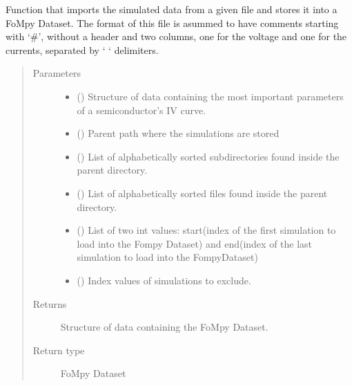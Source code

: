\documentclass[letterpaper,10pt,english,openany, oneside]{sphinxmanual}
\begin{document}
\begin{fulllineitems}
\label{\detokenize{index:fompy.fds.file}}
Function that imports the simulated data from a given file and
stores it into a FoMpy Dataset. The format of this file is asummed to have comments
starting with ‘\#’, without a header and two columns, one for the voltage and one for the currents, separated
by ‘    ‘ delimiters.
\begin{quote}\begin{description}
\item[{Parameters}] \leavevmode\begin{itemize}
\item {} 
 () \textendash{} Structure of data containing the most important parameters of a semiconductor’s IV curve.

\item {} 
 () \textendash{} Parent path where the simulations are stored

\item {} 
 () \textendash{} List of alphabetically sorted subdirectories found inside the parent directory.

\item {} 
 () \textendash{} List of alphabetically sorted files found inside the parent directory.

\item {} 
 () \textendash{} List of two int values: start(index of the first simulation to load into the Fompy Dataset)
and end(index of the last simulation to load into the FompyDataset)

\item {} 
 () \textendash{} Index values of simulations to exclude.

\end{itemize}

\item[{Returns}] \leavevmode
{} \textendash{} Structure of data containing the FoMpy Dataset.

\item[{Return type}] \leavevmode
FoMpy Dataset

\end{description}\end{quote}

\end{fulllineitems}
\end{document}
